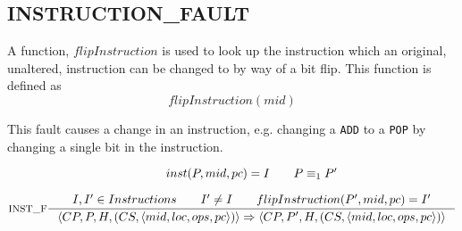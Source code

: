 \subsection{INSTRUCTION\_FAULT}
A function, $flipInstruction$ is used to look up the instruction which an original, unaltered, instruction can be changed to by way of a bit flip. This function is defined as
$$flipInstruction(mid)$$

This fault causes a change in an instruction, e.g. changing a \texttt{ADD} to a \texttt{POP} by changing a single bit in the instruction.

$$\inference[INST\_F]{
inst(P,mid, pc) = I \semsp
P \equiv_1 P' \semnl \\
I,I' \in Instructions \semsp
I' \neq I \semsp
flipInstruction(P',mid, pc) = I'
}
{\langle CP, P, H, (CS, \langle mid, loc, ops, pc \rangle) \rangle \Rightarrow \langle CP, P', H, (CS, \langle mid, loc, ops, pc \rangle)\rangle }$$
